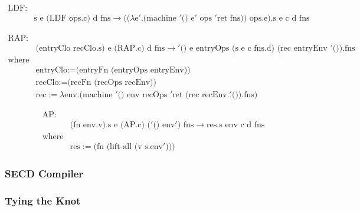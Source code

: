 \documentclass[fleqn]{article}
\theoremstyle{definition}
\begin{document}
\begin{equation*}
	\begin{split}
		\text{LDF:} & \\
		& \text{s e (LDF ops.c) d fns} \longrightarrow \text{(($\lambda$e$'$.(machine $'$() e$'$ ops $'$ret fns)) ops.e).s e c d fns}
	\end{split}
\end{equation*}

\begin{align*}
		\text{RAP:} & \\
		& \text{(entryClo recClo.s) e (RAP.c) d fns} \longrightarrow \text{$'$() e entryOps (s e c fns.d) (rec entryEnv $'$()).fns} \\
		\text{where}																																										\\
		& \text{entryClo} :=  \text{(entryFn (entryOps entryEnv))}																				\\
		& \text{recClo}	  :=  \text{(recFn (recOps recEnv))}																							\\
		& \text{rec}			:=  \text{$\lambda$env.(machine $'$() env recOps $'$ret (rec recEnv.$'$()).fns)}
\end{align*}

\begin{align*}
		\text{AP:} & \\
		& \text{(fn env.v).s e (AP.c) ($'$() env$'$) fns} \longrightarrow \text{res.s env c d fns}	\\
		\text{where}																																								\\
		& \text{res} 			:=  \text{(fn (lift-all (v s.env$'$)))}
\end{align*}

\subsubsection{SECD Compiler}

\subsubsection{Tying the Knot}
\end{document}
